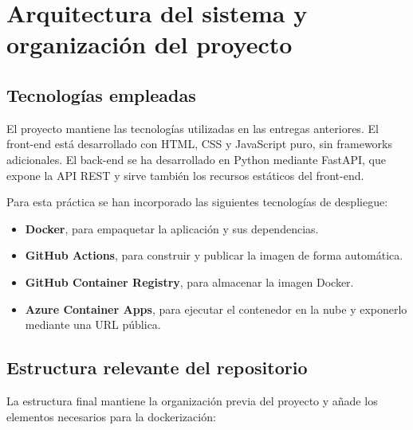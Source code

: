 \documentclass[11pt,a4paper]{article}
\begin{document}
\section{Arquitectura del sistema y organizaci\'on del proyecto}

\subsection{Tecnolog\'ias empleadas}

El proyecto mantiene las tecnolog\'ias utilizadas en las entregas anteriores. El front-end est\'a desarrollado con HTML, CSS y JavaScript puro, sin frameworks adicionales. El back-end se ha desarrollado en Python mediante FastAPI, que expone la API REST y sirve tambi\'en los recursos est\'aticos del front-end.

Para esta pr\'actica se han incorporado las siguientes tecnolog\'ias de despliegue:

\begin{itemize}
  \item \textbf{Docker}, para empaquetar la aplicaci\'on y sus dependencias.
  \item \textbf{GitHub Actions}, para construir y publicar la imagen de forma autom\'atica.
  \item \textbf{GitHub Container Registry}, para almacenar la imagen Docker.
  \item \textbf{Azure Container Apps}, para ejecutar el contenedor en la nube y exponerlo mediante una URL p\'ublica.
\end{itemize}

\subsection{Estructura relevante del repositorio}

La estructura final mantiene la organizaci\'on previa del proyecto y a\~nade los elementos necesarios para la dockerizaci\'on:
\end{document}
